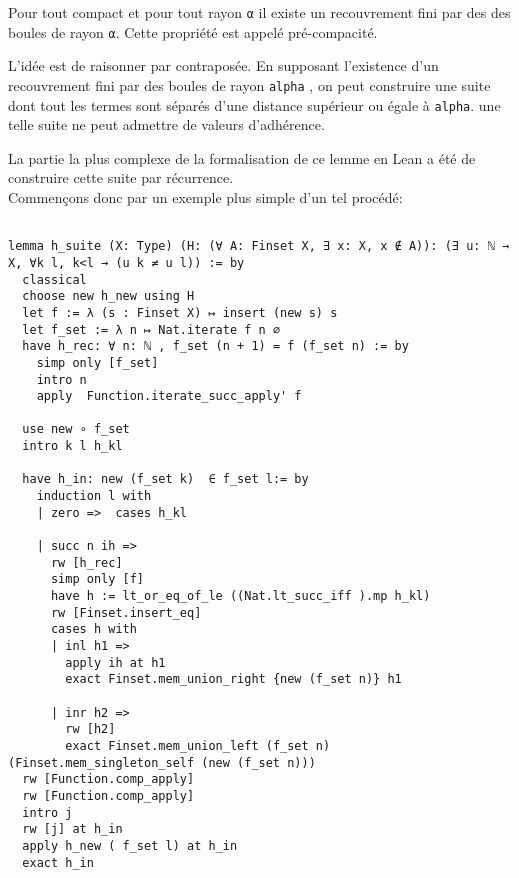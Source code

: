 \documentclass[a4paper, 12pt]{article}
\newcommand{\lean}[1]{\texttt{#1}}
\begin{document}
Pour tout compact et pour tout rayon \lean{α} il existe un recouvrement fini par des  des boules de rayon \lean{α}. Cette propriété est appelé pré-compacité.

L'idée est de raisonner par contraposée. En supposant l'existence d'un recouvrement fini par des boules de rayon \lean{alpha} , on peut construire une suite dont tout les termes sont séparés d'une distance supérieur ou égale à \lean{alpha}. une telle suite ne peut admettre de valeurs d'adhérence.

La partie la plus complexe de la formalisation de ce lemme en Lean a été de construire cette suite par récurrence.\\

Commençons donc par un exemple plus simple d'un tel procédé:

\begin{verbatim}

lemma h_suite (X: Type) (H: (∀ A: Finset X, ∃ x: X, x ∉ A)): (∃ u: ℕ → X, ∀k l, k<l → (u k ≠ u l)) := by 
  classical
  choose new h_new using H
  let f := λ (s : Finset X) ↦ insert (new s) s
  let f_set := λ n ↦ Nat.iterate f n ∅
  have h_rec: ∀ n: ℕ , f_set (n + 1) = f (f_set n) := by
    simp only [f_set]
    intro n
    apply  Function.iterate_succ_apply' f

  use new ∘ f_set
  intro k l h_kl

  have h_in: new (f_set k)  ∈ f_set l:= by 
    induction l with
    | zero =>  cases h_kl  

    | succ n ih => 
      rw [h_rec]
      simp only [f]
      have h := lt_or_eq_of_le ((Nat.lt_succ_iff ).mp h_kl)
      rw [Finset.insert_eq]
      cases h with
      | inl h1 => 
        apply ih at h1
        exact Finset.mem_union_right {new (f_set n)} h1
        
      | inr h2 => 
        rw [h2]
        exact Finset.mem_union_left (f_set n) (Finset.mem_singleton_self (new (f_set n)))
  rw [Function.comp_apply]
  rw [Function.comp_apply]
  intro j 
  rw [j] at h_in
  apply h_new ( f_set l) at h_in
  exact h_in


    
\end{verbatim}
\end{document}
